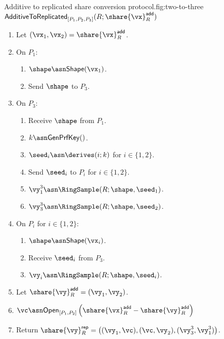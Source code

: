 
\begin{Boxfig}{Additive to replicated share conversion protocol.}{fig:two-to-three}{$\mathsf{AdditiveToReplicated}_{[P_1, P_2, P_3]}(R; \share{\vx}^{\mathsf{add}}_{R})$}
\begin{enumerate}
\item Let $(\vx_1, \vx_2) = \share{\vx}^{\mathsf{add}}_{R}$.

\item On $P_1$:
\begin{enumerate}
  \item $\shape \asn \mathsf{Shape}(\vx_1)$.
  \item Send $\shape$ to $P_3$.
\end{enumerate}

\item On $P_3$:
\begin{enumerate}
  \item Receive $\shape$ from $P_1$.
  \item $k \asn \mathsf{GenPrfKey}()$.
  \item $\seed_i \asn \derives(i; k)$ for $i \in \{1, 2\}$.
  \item Send $\seed_i$ to $P_i$ for $i \in \{1, 2\}$.
  \item $\vy_1^3 \asn \RingSample(R; \shape, \seed_1)$.
  \item $\vy_3^3 \asn \RingSample(R; \shape, \seed_2)$.
\end{enumerate}

\item On $P_i$ for $i \in \{1,2\}$:
\begin{enumerate}
  \item $\shape \asn \mathsf{Shape}(\vx_i)$.
  \item Receive $\seed_i$ from $P_3$.
  \item $\vy_i \asn \RingSample(R; \shape, \seed_i)$.
\end{enumerate}

\item Let $\share{\vy}^{\mathsf{add}}_{R} = (\vy_1, \vy_2)$.

\item $\vc \asn \mathsf{Open}_{[P_1, P_2]}\left( \share{\vx}^{\mathsf{add}}_{R} - \share{\vy}^{\mathsf{add}}_{R} \right)$

\item Return $\share{\vy}^{\mathsf{rep}}_{R} = \left( (\vy_1, \vc), (\vc, \vy_2), (\vy_3^3, \vy_1^3) \right)$.
\end{enumerate}
\end{Boxfig}

